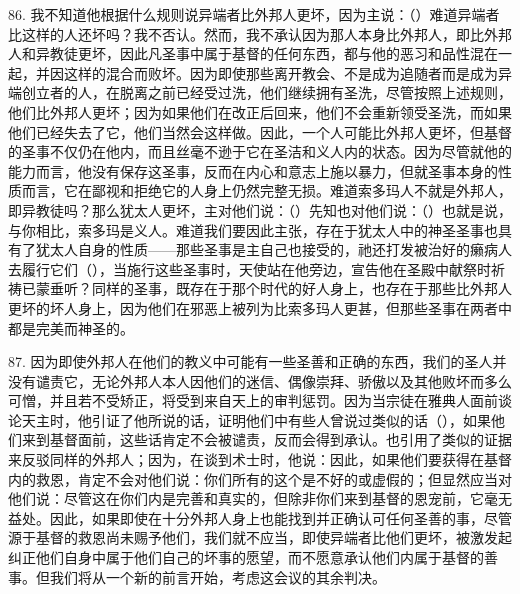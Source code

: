 86. 我不知道他根据什么规则说异端者比外邦人更坏，因为主说：（）难道异端者比这样的人还坏吗？我不否认。然而，我不承认因为那人本身比外邦人，即比外邦人和异教徒更坏，因此凡圣事中属于基督的任何东西，都与他的恶习和品性混在一起，并因这样的混合而败坏。因为即使那些离开教会、不是成为追随者而是成为异端创立者的人，在脱离之前已经受过洗，他们继续拥有圣洗，尽管按照上述规则，他们比外邦人更坏；因为如果他们在改正后回来，他们不会重新领受圣洗，而如果他们已经失去了它，他们当然会这样做。因此，一个人可能比外邦人更坏，但基督的圣事不仅仍在他内，而且丝毫不逊于它在圣洁和义人内的状态。因为尽管就他的能力而言，他没有保存这圣事，反而在内心和意志上施以暴力，但就圣事本身的性质而言，它在鄙视和拒绝它的人身上仍然完整无损。难道索多玛人不就是外邦人，即异教徒吗？那么犹太人更坏，主对他们说：（）先知也对他们说：（）也就是说，与你相比，索多玛是义人。难道我们要因此主张，存在于犹太人中的神圣圣事也具有了犹太人自身的性质——那些圣事是主自己也接受的，祂还打发被治好的癞病人去履行它们（），当施行这些圣事时，天使站在他旁边，宣告他在圣殿中献祭时祈祷已蒙垂听？同样的圣事，既存在于那个时代的好人身上，也存在于那些比外邦人更坏的坏人身上，因为他们在邪恶上被列为比索多玛人更甚，但那些圣事在两者中都是完美而神圣的。\par

87. 因为即使外邦人在他们的教义中可能有一些圣善和正确的东西，我们的圣人并没有谴责它，无论外邦人本人因他们的迷信、偶像崇拜、骄傲以及其他败坏而多么可憎，并且若不受矫正，将受到来自天上的审判惩罚。因为当宗徒在雅典人面前谈论天主时，他引证了他所说的话，证明他们中有些人曾说过类似的话（），如果他们来到基督面前，这些话肯定不会被谴责，反而会得到承认。也引用了类似的证据来反驳同样的外邦人；因为，在谈到术士时，他说：因此，如果他们要获得在基督内的救恩，肯定不会对他们说：你们所有的这个是不好的或虚假的；但显然应当对他们说：尽管这在你们内是完善和真实的，但除非你们来到基督的恩宠前，它毫无益处。因此，如果即使在十分外邦人身上也能找到并正确认可任何圣善的事，尽管源于基督的救恩尚未赐予他们，我们就不应当，即使异端者比他们更坏，被激发起纠正他们自身中属于他们自己的坏事的愿望，而不愿意承认他们内属于基督的善事。但我们将从一个新的前言开始，考虑这会议的其余判决。\par

